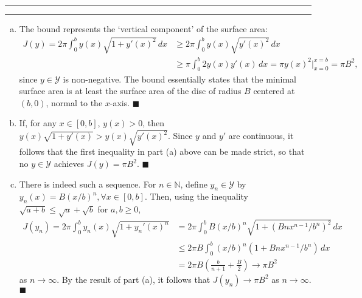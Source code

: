 \documentclass[11pt]{article}
\newcounter{questionCounter}
\newcounter{partCounter}[questionCounter]
\newenvironment{question}[2][\arabic{questionCounter}]{%
    \setcounter{partCounter}{0}%
    \vspace{.25in} \hrule \vspace{0.5em}%
        \noindent{\bf #2}%
    \vspace{0.8em} \hrule \vspace{.10in}%
    \addtocounter{questionCounter}{1}%
}{}
\renewcommand{\qed}{\quad \ensuremath{\blacksquare}}
\newcommand{\N}{\mathbb{N}}             %
\newcommand{\Y}{\mathcal{Y}}            %
\begin{document}
\begin{question}{Problem 3}
\begin{enumerate}[(a)]
\item The bound represents the `vertical component' of the surface area:
\begin{align*}
J(y)
    = 2 \pi \int_0^b y(x) \sqrt{1 + y'(x)^2} \, dx
 &  \geq 2 \pi \int_0^b y(x) \sqrt{y'(x)^2} \, dx  \\
 &  \geq \pi \int_0^b 2 y(x) y'(x) \, dx
    = \pi y(x)^2 \bigg|_{x = 0}^{x = b}
    = \pi B^2,
\end{align*}
since $y \in \Y$ is non-negative. The bound essentially states that the minimal
surface area is at least the surface area of the disc of radius $B$ centered at
$(b,0)$, normal to the $x$-axis. \qed
 
\item If, for any $x \in [0,b]$, $y(x) > 0$, then
$y(x)\sqrt{1 + y'(x)} > y(x)\sqrt{y'(x)^2}$. Since $y$ and $y'$ are continuous,
it follows that the first inequality in part (a) above can be made strict, so
that no $y \in \Y$ achieves $J(y) = \pi B^2$. \qed
 
\item There is indeed such a sequence. For $n \in \N$, define $y_n \in \Y$ by
$y_n(x) = B(x/b)^n, \forall x \in [0,b]$. Then, using the inequality
$\sqrt{a + b} \leq \sqrt{a} + \sqrt{b}$ for $a,b \geq 0$,
\begin{align*}
J(y_n)
    = 2\pi \int_0^b y_n(x) \sqrt{1 + y_n'(x)^n}
 &  = 2\pi \int_0^b B(x/b)^n \sqrt{1 + (Bnx^{n - 1}/b^n)^2} \, dx  \\
 &  \leq 2\pi B \int_0^b (x/b)^n(1 + Bnx^{n - 1}/b^n) \, dx \\
 &  = 2\pi B \left( \frac{b}{n + 1} + \frac{B}{2} \right)
    \to \pi B^2
\end{align*}
as $n \to \infty$. By the result of part (a), it follows that
$J(y_n) \to \pi B^2$ as $n \to \infty$. \qed
 
\end{enumerate}
\end{question}
\end{document}
